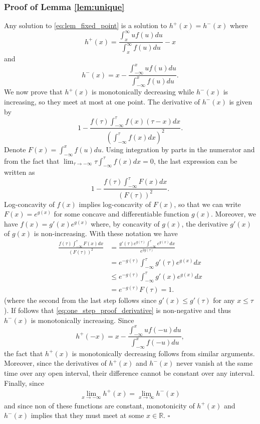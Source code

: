 \documentclass[letterpaper, conference, 11pt]{IEEEtran}      %
\newcommand*{\QEDA}{\hfill\ensuremath{\square}}
\begin{document}
\subsubsection*{Proof of Lemma \ref{lem:unique}} 
Any solution to \eqref{eq:lem_fixed_point} is a solution to $h^+(x) = h^-(x)$ where
\[
h^+(x) = \frac{\int_x^\infty uf(u)du}{\int_x^\infty f(u)du} - x 
\]
and
\[
h^-(x) = x - \frac{\int_{-\infty}^x uf(u)du}{\int_{-\infty}^x f(u)du}.
\]
We now prove that $h^+(x)$ is monotonically decreasing while $h^-(x)$ is increasing, so they meet at most at one point. The derivative of $h^-(x)$ is given by
\begin{equation} 
\label{eq:one_step_proof_derivative}
1 - \frac{ f(\tau) \int_{-\infty}^\tau f(x) (\tau-x)dx } {\left( \int_{-\infty}^\tau f(x) dx \right)^2}.
\end{equation}
Denote $F(x) = \int_{-\infty}^x f(u)du$. Using integration by parts in the numerator and from the fact that $\lim_{\tau \rightarrow -\infty}  \tau \int_{-\infty}^\tau f(x) dx = 0$, the last expression can be written as
\[
1- \frac{ f(\tau) \int_{-\infty}^\tau F(x) dx}
 {\left( F(\tau) \right)^2}.
\]
Log-concavity of $f(x)$ implies log-concavity of $F(x)$, so that we can write $F(x) = e^{g(x)}$ for some concave and differentiable function $g(x)$. Moreover, we have $f(x) = g'(x)e^{g(x)}$ where, by concavity of $g(x)$, the derivative $g'(x)$ of $g(x)$ is non-increasing. With these notation we have
\begin{align*}
\frac{ f(\tau) \int_{-\infty}^\tau F(x) dx}
 {\left( F(\tau) \right)^2} & = \frac{g'(\tau)e^{g(\tau)} \int_{-\infty}^\tau e^{g(x)}dx }{ e^{2g(\tau)} } \\
 & = e^{-g(\tau)} \int_{-\infty}^\tau g'(\tau) e^{g(x)} dx  \\
 & \leq e^{-g(\tau)} \int_{-\infty}^\tau g'(x) e^{g(x)} dx \\
 & = e^{-g(\tau)} F(\tau) = 1.
\end{align*}
(where the second from the last step follows since $g'(x) \leq g'(\tau)$ for any $x\leq \tau$). If follows that \eqref{eq:one_step_proof_derivative} is non-negative and thus $h^-(x)$ is monotonically increasing. Since
\[
h^+(-x) = x - \frac{ \int_{-\infty}^{x} uf(-u)du}{ \int_{-\infty}^x f(-u) du }, 
\]
the fact that $h^+(x)$ is monotonically decreasing follows from similar arguments. Moreover, since the derivatives of $h^+(x)$ and $h^-(x)$ never vanish at the same time over any open interval, their difference cannot be constant over any interval. Finally, since 
\begin{align*}
 \lim_{x\rightarrow -\infty} h^+(x) =  \lim_{x\rightarrow \infty} h^-(x)
\end{align*}
and since non of these functions are constant, monotonicity of $h^+(x)$ and $h^-(x)$ implies that they must meet at some $x\in \mathbb R$. \QEDA
\end{document}
